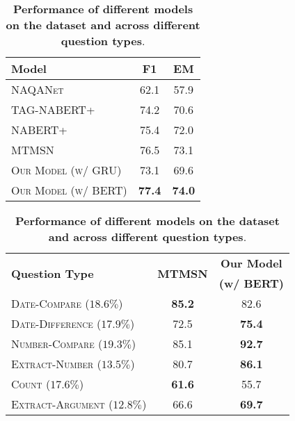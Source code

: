 \documentclass[main.tex]{subfiles}
\begin{document}
\begin{table}[tb]
\begin{subtable}[h]{0.4\textwidth}
\footnotesize
\centering
    \begin{tabular}{l c c}
    \toprule
    \bf Model & \bf F1 & \bf EM \\
    \midrule
    \textsc{NAQANet}                    & 62.1 & 57.9 \\
    \addlinespace[1mm]
    \textsc{TAG-NABERT+}                 & 74.2 & 70.6 \\
    \textsc{NABERT+}                    & 75.4 & 72.0 \\
    \textsc{MTMSN}                      & 76.5 & 73.1 \\
    \addlinespace[1mm]
    \textsc{Our Model (w/ GRU)}            & 73.1 & 69.6 \\
    \textsc{Our Model (w/ BERT)}           & \textbf{77.4} & \textbf{74.0} \\
    \bottomrule
    \end{tabular}
    \caption{
        \label{tab:02-mainresults}
        \textbf{Performance on $\drop$ (pruned)}
    }
\end{subtable}
\hspace{1cm}
\begin{subtable}[h]{0.4\textwidth}
\footnotesize
\centering
	\begin{tabular}{l c c}
        \toprule
        \multirow{2}{*}{{\bf Question Type}}         & \multirow{2}{*}{{\bf MTMSN}}    &    {\bf Our Model} \\
        &                &    {\bf (w/ BERT)} \\
        \midrule
        \textsc{Date-Compare} ($18.6\%$)       & \textbf{85.2} & 82.6           \\
        \textsc{Date-Difference} ($17.9\%$)    & 72.5          & \textbf{75.4}  \\
        \textsc{Number-Compare} ($19.3\%$)     & 85.1          & \textbf{92.7}  \\
        \textsc{Extract-Number} ($13.5\%$)     & 80.7          & \textbf{86.1}  \\
        \textsc{Count} ($17.6\%$)              & \textbf{61.6} & 55.7           \\
        \textsc{Extract-Argument} ($12.8\%$)   & 66.6          & \textbf{69.7}  \\
        \bottomrule
        \end{tabular}
        \caption{
            \label{tab:02-qtype}
            \textbf{Performance by Question Type (F1)}
        }
\end{subtable}
\caption{
    \label{tab:02-perf}
    \textbf{Performance of different models on the dataset and across different question types}.
}
\end{table}
\end{document}
